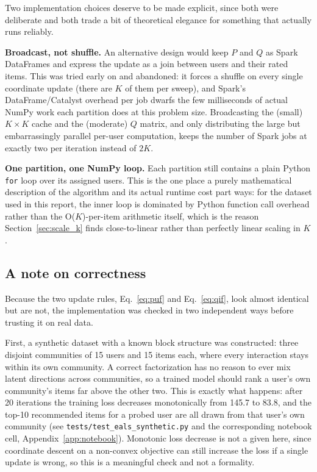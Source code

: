 \medskip
Two implementation choices deserve to be made explicit, since both were
deliberate and both trade a bit of theoretical elegance for something that
actually runs reliably.

\begin{bulletlist}
  \item \textbf{Broadcast, not shuffle.} An alternative design would keep
        $P$ and $Q$ as Spark DataFrames and express the update as a join
        between users and their rated items. This was tried early on and
        abandoned: it forces a shuffle on every single coordinate update
        (there are $K$ of them per sweep), and Spark's DataFrame/Catalyst
        overhead per job dwarfs the few milliseconds of actual NumPy work
        each partition does at this problem size. Broadcasting the (small)
        $K\times K$ cache and the (moderate) $Q$ matrix, and only
        distributing the large but embarrassingly parallel per-user
        computation, keeps the number of Spark jobs at exactly two per
        iteration instead of $2K$.
  \item \textbf{One partition, one NumPy loop.} Each partition still
        contains a plain Python \texttt{for} loop over its assigned users.
        This is the one place a purely mathematical description of the
        algorithm and its actual runtime cost part ways: for the dataset
        used in this report, the inner loop is dominated by Python function
        call overhead rather than the O($K$)-per-item arithmetic itself,
        which is the reason Section~\ref{sec:scale_k} finds close-to-linear
        rather than perfectly linear scaling in $K$.
\end{bulletlist}

\subsection{A note on correctness}
\label{sec:correctness}

Because the two update rules, Eq.~\ref{eq:puf} and Eq.~\ref{eq:qif}, look
almost identical but are not, the implementation was checked in two
independent ways before trusting it on real data.

\medskip
First, a synthetic dataset with a known block structure was constructed:
three disjoint communities of 15 users and 15 items each, where every
interaction stays within its own community. A correct factorization has no
reason to ever mix latent directions across communities, so a trained model
should rank a user's own community's items far above the other two. This
is exactly what happens: after 20 iterations the training loss decreases
monotonically from 145.7 to 83.8, and the top-10 recommended items for a
probed user are all drawn from that user's own community (see
\texttt{tests/test\_eals\_synthetic.py} and the corresponding notebook
cell, Appendix~\ref{app:notebook}). Monotonic loss decrease is not a given
here, since coordinate descent on a non-convex objective can still increase
the loss if a single update is wrong, so this is a meaningful check and not
a formality.

